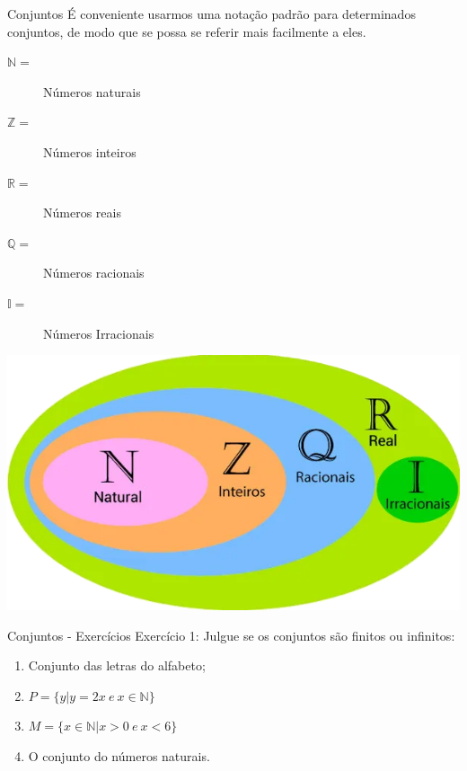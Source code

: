 \documentclass[aspectratio=169]{beamer}
\begin{document}
\begin{frame}{Conjuntos}
    É conveniente usarmos uma notação padrão para determinados conjuntos, de modo que se possa se referir mais facilmente a eles.

    \vspace{4mm}

    \begin{multicols}{2}
        \begin{description}
            \item[$\mathbb{N} =$] Números naturais
            \item[$\mathbb{Z} =$] Números inteiros
            \item[$\mathbb{R} =$] Números reais
            \item[$\mathbb{Q} =$] Números racionais
            \item[$\mathbb{I} =$] Números Irracionais 
        \end{description}
        
        \columnbreak

        \begin{center}
            \includegraphics[width=\linewidth]{figs/conjuntos.png}
        \end{center}
    \end{multicols}
    
\end{frame}


\begin{frame}{Conjuntos - Exercícios}
    Exercício 1: Julgue se os conjuntos são finitos ou infinitos:
    \vspace{4mm}
\begin{enumerate}
    \item Conjunto das letras do alfabeto;
    \item $P = \{y | y = 2x ~ e ~ x \in \mathbb{N} \}$
    \item $M = \{x \in \mathbb{N} | x > 0 ~ e ~ x < 6\}$
    \item O conjunto do números naturais.
\end{enumerate}    
\end{frame}
\end{document}

